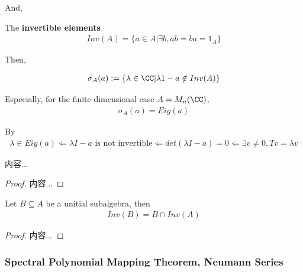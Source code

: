 \documentclass[Total.tex]{subfiles}
\begin{document}
			
			And,
			\begin{Def}
				The \textbf{invertible elements}
				\begin{gather*}
					Inv(A)=\{a\in A|\exists b, ab=ba=1_A\}
				\end{gather*}
			\end{Def}
			
			Then,
			\begin{Def}
				\begin{gather*}
					\sigma_A(a):=\{\lambda\in \CC|\lambda 1-a\notin Inv(A)\}
				\end{gather*}
			\end{Def}
			
			Especially, for the finite-dimensional case $A=M_n(\CC)$,
			\begin{gather*}
				\sigma_A(a)=Eig(a)
			\end{gather*}
			
			By
			\begin{gather*}
				\lambda\in Eig(a)\Leftarrow \lambda I-a\mbox{ is not invertible}\Leftarrow det(\lambda I-a)=0\Leftarrow \exists v\not=0, Tv=\lambda v
			\end{gather*}
			
			\begin{proposition}
				内容...
			\end{proposition}
			\begin{proof}
				内容...
			\end{proof}
			
			\begin{proposition}
				Let $B\subseteq A$ be a unitial subalgebra, then
				\begin{gather*}
					Inv(B)=B\cap Inv(A)
				\end{gather*}
			\end{proposition}
			\begin{proof}
				内容...
			\end{proof}
			
			\subsubsection{Spectral Polynomial  Mapping Theorem, Neumann Series}
			
\end{document}
